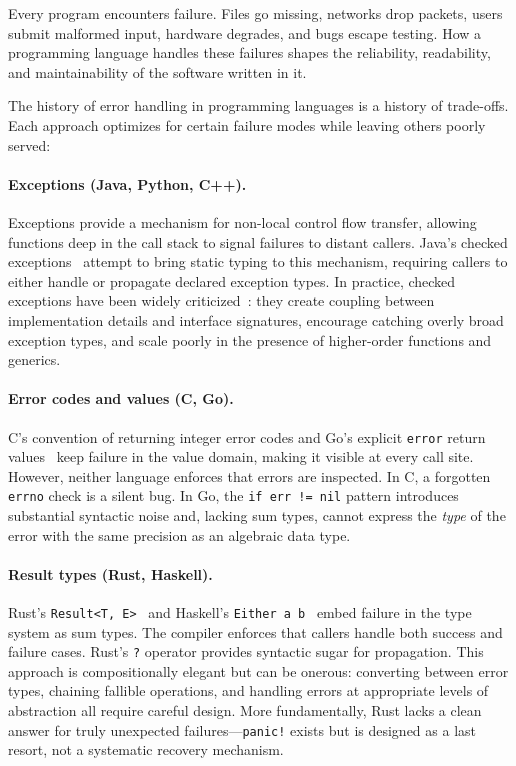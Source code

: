 \documentclass[11pt,twocolumn]{article}
\begin{document}
Every program encounters failure. Files go missing, networks drop packets, users submit malformed input, hardware degrades, and bugs escape testing. How a programming language handles these failures shapes the reliability, readability, and maintainability of the software written in it.

The history of error handling in programming languages is a history of trade-offs. Each approach optimizes for certain failure modes while leaving others poorly served:

\paragraph{Exceptions (Java, Python, C++).} Exceptions provide a mechanism for non-local control flow transfer, allowing functions deep in the call stack to signal failures to distant callers. Java's checked exceptions~\cite{gosling2014java} attempt to bring static typing to this mechanism, requiring callers to either handle or propagate declared exception types. In practice, checked exceptions have been widely criticized~\cite{eckel2003thinking,bloch2008effective}: they create coupling between implementation details and interface signatures, encourage catching overly broad exception types, and scale poorly in the presence of higher-order functions and generics.

\paragraph{Error codes and values (C, Go).} C's convention of returning integer error codes and Go's explicit \texttt{error} return values~\cite{pike2012go} keep failure in the value domain, making it visible at every call site. However, neither language enforces that errors are inspected. In C, a forgotten \texttt{errno} check is a silent bug. In Go, the \texttt{if err != nil} pattern introduces substantial syntactic noise and, lacking sum types, cannot express the \emph{type} of the error with the same precision as an algebraic data type.

\paragraph{Result types (Rust, Haskell).} Rust's \texttt{Result<T, E>}~\cite{matsakis2014rust} and Haskell's \texttt{Either a b}~\cite{marlow2010haskell} embed failure in the type system as sum types. The compiler enforces that callers handle both success and failure cases. Rust's \texttt{?} operator provides syntactic sugar for propagation. This approach is compositionally elegant but can be onerous: converting between error types, chaining fallible operations, and handling errors at appropriate levels of abstraction all require careful design. More fundamentally, Rust lacks a clean answer for truly unexpected failures---\texttt{panic!} exists but is designed as a last resort, not a systematic recovery mechanism.
\end{document}
